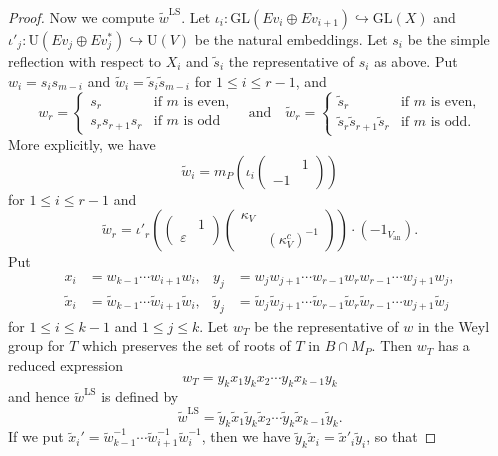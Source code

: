 \documentclass[11pt]{amsart}
\numberwithin{equation}{section}
\theoremstyle{plain}
\theoremstyle{definition}
\theoremstyle{remark}
\def\an{\mathrm{an}}
\def\GL{\mathrm{GL}}
\def\LS{\mathrm{LS}}
\def\U{\mathrm{U}}
\begin{document}
\begin{proof}
Now we compute $\tilde{w}^\LS$.
Let $\iota_i : \GL(E v_i \oplus E v_{i+1}) \hookrightarrow \GL(X)$ and $\iota'_j : \U(E v_j \oplus E v_j^*) \hookrightarrow \U(V)$ be the natural embeddings.
Let $s_i$ be the simple reflection with respect to $X_i$ and $\tilde{s}_i$ the representative of $s_i$ as above.
Put $w_i = s_i s_{m-i}$ and $\tilde{w}_i = \tilde{s}_i \tilde{s}_{m-i}$ for $1 \le i \le r-1$, and 
\[
 w_r = 
 \begin{cases}
  s_r & \text{if $m$ is even,} \\
  s_r s_{r+1} s_r & \text{if $m$ is odd}
 \end{cases}
 \quad \text{and} \quad
 \tilde{w}_r = 
 \begin{cases}
  \tilde{s}_r & \text{if $m$ is even,} \\
  \tilde{s}_r \tilde{s}_{r+1} \tilde{s}_r & \text{if $m$ is odd.}
 \end{cases}
\]
More explicitly, we have
\[
 \tilde{w}_i = m_P \left( \iota_i \begin{pmatrix} & 1 \\ -1 & \end{pmatrix}
 \right)
\]
for $1 \le i \le r-1$ and 
\[
 \tilde{w}_r = \iota'_r \left(
 \begin{pmatrix}
 & 1 \\
 \varepsilon &
 \end{pmatrix}
 \begin{pmatrix}
 \kappa_V & \\
 & (\kappa_V^c)^{-1}
 \end{pmatrix}
 \right)
 \cdot (-1_{V_{\an}}).
\]
Put
\begin{align*}
 x_i & = w_{k-1} \cdots w_{i+1} w_i, &
 y_j & = w_j w_{j+1} \cdots w_{r-1} w_r w_{r-1} \cdots w_{j+1} w_j, \\
 \tilde{x}_i & = \tilde{w}_{k-1} \cdots \tilde{w}_{i+1} \tilde{w}_i, &
 \tilde{y}_j & = \tilde{w}_j \tilde{w}_{j+1} \cdots \tilde{w}_{r-1} \tilde{w}_r \tilde{w}_{r-1} \cdots w_{j+1} \tilde{w}_j
\end{align*}
for $1 \le i \le k-1$ and $1 \le j \le k$.
Let $w_T$ be the representative of $w$ in the Weyl group for $T$ which preserves the set of roots of $T$ in $B \cap M_P$.
Then $w_T$ has a reduced expression
\[
 w_T = y_k x_1 y_k x_2 \cdots y_k x_{k-1} y_k
\]
and hence $\tilde{w}^\LS$ is defined by
\[
 \tilde{w}^\LS = \tilde{y}_k \tilde{x}_1 \tilde{y}_k \tilde{x}_2 \cdots \tilde{y}_k \tilde{x}_{k-1} \tilde{y}_k.
\]
If we put $\tilde{x}_i' = \tilde{w}_{k-1}^{-1} \cdots \tilde{w}_{i+1}^{-1} \tilde{w}_i^{-1}$, then we have $\tilde{y}_k \tilde{x}_i = \tilde{x}'_i \tilde{y}_i$, so that 

\end{proof}
\end{document}
